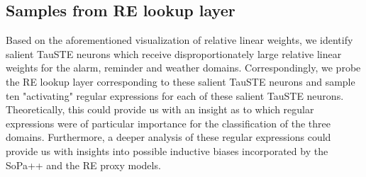 \subsection{Samples from RE lookup layer}

Based on the aforementioned visualization of relative linear weights, we
identify salient TauSTE neurons which receive disproportionately large relative
linear weights for the alarm, reminder and weather domains. Correspondingly,
we probe the RE lookup layer corresponding to these salient TauSTE neurons and
sample ten "activating" regular expressions for each of these salient TauSTE
neurons. Theoretically, this could provide us with an insight as to which
regular expressions were of particular importance for the classification of the
three domains. Furthermore, a deeper analysis of these regular expressions
could provide us with insights into possible inductive biases incorporated by the
SoPa++ and the RE proxy models.

